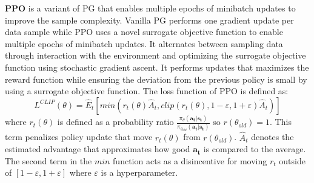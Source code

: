 \textbf{PPO} is a variant of PG that enables multiple epochs of minibatch updates to improve the sample complexity.
Vanilla PG performs one gradient update per data sample while PPO uses a novel surrogate objective function to enable multiple epochs of minibatch updates. It alternates between sampling data through interaction with the environment and optimizing the surrogate objective function using stochastic gradient ascent.
It performs updates that maximizes the reward function while ensuring the deviation from the previous policy is small by using a surrogate objective function. The loss function of PPO is defined as:%
\begin{equation}\label{eq:ppo}
L^{CLIP}(\theta) =
\hat{E}_{t}[ min( r_t(\theta)\hat{A}_t, clip(r_t(\theta), 1 - \varepsilon, 1 + \varepsilon) \hat{A}_t )]
\end{equation}
where $r_t(\theta)$ is defined as a probability ratio 
$\frac{\pi_\theta(\mathbf{a_t} | \mathbf{s_t})}{\pi_{\theta_{old}}(\mathbf{a_t} | \mathbf{s_t})}$
so $r(\theta_{old}) = 1$. This term penalizes policy update that move $r_t(\theta)$ from $r(\theta_{old})$.
$\hat{A}_t$ denotes the estimated advantage that approximates how good $\mathbf{a_t}$ is compared to the average. 
The second term in the $min$ function acts as a disincentive for moving $r_t$ outside of $[1-\varepsilon, 1+\varepsilon]$ where $\varepsilon$ is a hyperparameter.

